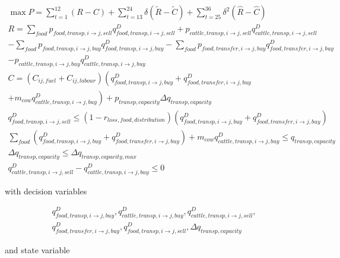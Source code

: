 \documentclass[letter,12pt]{article}
\begin{document}
\begin{gather}
\max P = \sum_{t=1}^{12} \left(R - C\right) + \sum_{t=13}^{24} \delta \left(\tilde{R} - \tilde{C}\right) + \sum_{t=25}^{36} \delta^2 \left(\hat{R} - \hat{C}\right) \\
R = \sum_{food} p_{food,transp,i\rightarrow j,sell} q_{food,transp,i \rightarrow j,sell}^D + p_{cattle,transp,i \rightarrow j,sell} q_{cattle,transp,i \rightarrow j,sell}^D \nonumber \\
- \sum_{food} p_{food,transp,i \rightarrow j,buy} q_{food,transp,i \rightarrow j,buy}^D - \sum_{food} p_{food,transfer,i \rightarrow j,buy} q_{food,transfer,i \rightarrow j,buy}^D \nonumber \\
- p_{cattle,transp,i \rightarrow j,buy} q_{cattle,transp,i \rightarrow j,buy}^D \\
C = \left(C_{ij,fuel} + C_{ij,labour}\right)\left( q_{food,transp,i\rightarrow j,buy}^D + q_{food,transfer,i\rightarrow j,buy}^D \right. \nonumber \\ 
\left. + m_{cow} q_{cattle,transp,i\rightarrow j,buy}^D\right)  + p_{transp,capacity} \Delta q_{transp,capacity} \\
q_{food,transp,i \rightarrow j,sell}^D \leq \left(1 - r_{loss,food,distribution}\right) \left(q_{food,transp,i \rightarrow j,buy}^D + q_{food,transfer,i \rightarrow j,buy}^D \right) \label{transp eff con} \\
\sum_{food} \left( q_{food,transp,i \rightarrow j,buy}^D + q_{food,transfer,i \rightarrow j,buy}^D \right) + m_{cow} q_{cattle,transp,i \rightarrow j,buy}^D \leq q_{transp,capacity}
\label{capacity limit con} \\
\Delta q_{transp,capacity} \leq \Delta q_{transp,capacity,max} \label{capacity exp con}\\
q_{cattle,transp,i \rightarrow j,sell}^D - q_{cattle,transp,i \rightarrow j,buy}^D \leq 0 \label{cattle transp con}
\end{gather}

\noindent with decision variables 

\begin{align}
q_{food,transp,i \rightarrow j,buy}^D,q_{cattle,transp,i \rightarrow j,buy}^D,q_{cattle,transp,i \rightarrow j,sell}^D, \nonumber \\
q_{food,transfer,i \rightarrow j,buy}^D,q_{food,transp,i \rightarrow j,sell}^D,\Delta q_{transp,capacity}
\end{align}

\noindent and state variable
\end{document}
